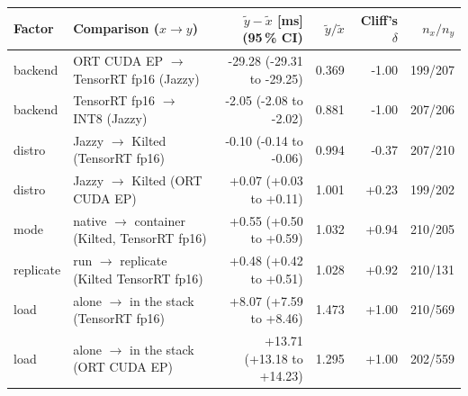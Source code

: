 \begin{tabular}{@{}llrrrr@{}}
\toprule
Factor & Comparison ($x \to y$) & $\tilde y - \tilde x$ [ms] (95\,\% CI) & $\tilde y / \tilde x$ & Cliff's $\delta$ & $n_x / n_y$ \\
\midrule
backend & ORT CUDA EP $\to$ TensorRT fp16 (Jazzy) & -29.28 (-29.31 to -29.25) & 0.369 & -1.00 & 199/207 \\
backend & TensorRT fp16 $\to$ INT8 (Jazzy) & -2.05 (-2.08 to -2.02) & 0.881 & -1.00 & 207/206 \\
distro & Jazzy $\to$ Kilted (TensorRT fp16) & -0.10 (-0.14 to -0.06) & 0.994 & -0.37 & 207/210 \\
distro & Jazzy $\to$ Kilted (ORT CUDA EP) & +0.07 (+0.03 to +0.11) & 1.001 & +0.23 & 199/202 \\
mode & native $\to$ container (Kilted, TensorRT fp16) & +0.55 (+0.50 to +0.59) & 1.032 & +0.94 & 210/205 \\
replicate & run $\to$ replicate (Kilted TensorRT fp16) & +0.48 (+0.42 to +0.51) & 1.028 & +0.92 & 210/131 \\
load & alone $\to$ in the stack (TensorRT fp16) & +8.07 (+7.59 to +8.46) & 1.473 & +1.00 & 210/569 \\
load & alone $\to$ in the stack (ORT CUDA EP) & +13.71 (+13.18 to +14.23) & 1.295 & +1.00 & 202/559 \\
\bottomrule
\end{tabular}
